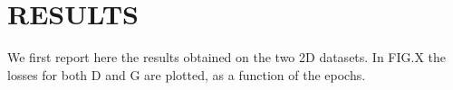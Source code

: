 \section{RESULTS} \label{results}

We first report here the results obtained on the two 2D datasets. In FIG.X the losses for both D and G are plotted, as a function of the epochs.